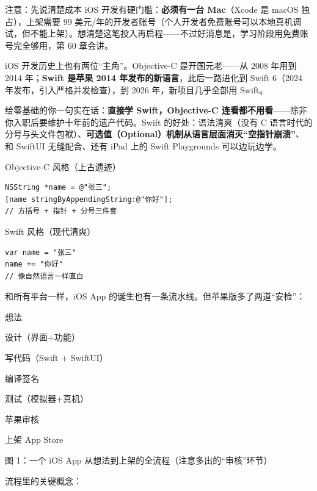 \begin{tcbwarn}{注意：先说清楚成本}
iOS 开发有硬门槛：\textbf{必须有一台 Mac}（Xcode 是 macOS 独占），上架需要 99 美元/年的开发者账号（个人开发者免费账号可以本地真机调试，但不能上架）。想清楚这笔投入再启程——不过好消息是，学习阶段用免费账号完全够用，第 60 章会讲。

\end{tcbwarn}


iOS 开发历史上也有两位“主角”。Objective-C 是开国元老——从 2008 年用到 2014 年；\textbf{Swift 是苹果 2014 年发布的新语言}，此后一路进化到 Swift 6（2024 年发布，引入严格并发检查），到 2026 年，新项目几乎全部用 Swift。

给零基础的你一句实在话：\textbf{直接学 Swift，Objective-C 连看都不用看}——除非你入职后要维护十年前的遗产代码。Swift 的好处：语法清爽（没有 C 语言时代的分号与头文件包袱）、\textbf{可选值（Optional）机制从语言层面消灭“空指针崩溃”}、和 SwiftUI 无缝配合、还有 iPad 上的 Swift Playgrounds 可以边玩边学。

Objective-C 风格（上古遗迹）

\begin{lstlisting}
NSString *name = @"张三";
[name stringByAppendingString:@"你好"];
// 方括号 + 指针 + 分号三件套
\end{lstlisting}

Swift 风格（现代清爽）

\begin{lstlisting}
var name = "张三"
name += "你好"
// 像自然语言一样直白
\end{lstlisting}


和所有平台一样，iOS App 的诞生也有一条流水线。但苹果版多了两道“安检”：

想法

设计（界面+功能）

写代码（Swift + SwiftUI）

编译签名

测试（模拟器+真机）

苹果审核

上架 App Store

\begin{center}\small\color{gray}图 1：一个 iOS App 从想法到上架的全流程（注意多出的“审核”环节）\end{center}

流程里的关键概念：

